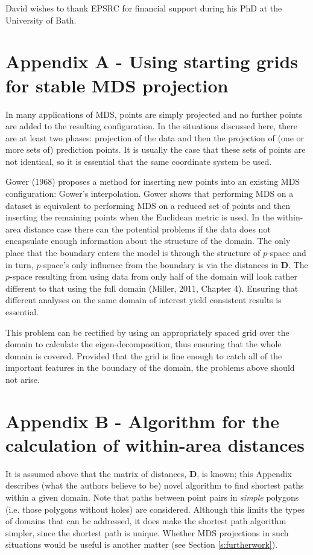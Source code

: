 \documentclass[useAMS, referee]{biom}
\begin{document}
David wishes to thank EPSRC for financial support during his PhD at the University of Bath.


\section*{Appendix A - Using starting grids for stable MDS projection}

In many applications of MDS, points are simply projected and no further points are added to the resulting configuration. In the situations discussed here, there are at least two phases: projection of the data and then the projection of (one or more sets of) prediction points. It is usually the case that these sets of points are not identical, so it is essential that the same coordinate system be used.

Gower (1968) proposes a method for inserting new points into an existing MDS configuration: Gower's interpolation. Gower shows that performing MDS on a dataset is equivalent to performing MDS on a reduced set of points and then inserting the remaining points when the Euclidean metric is used. In the within-area distance case there can the potential problems if the data does not encapsulate enough information about the structure of the domain. The only place that the boundary enters the model is through the structure of $p$-space and in turn, $p$-space's only influence from the boundary is via the distances in $\mathbf{D}$. The $p$-space resulting from using data from only half of the domain will look rather different to that using the full domain (Miller, 2011, Chapter 4). Ensuring that different analyses on the same domain of interest yield consistent results is essential.

This problem can be rectified by using an appropriately spaced grid over the domain to calculate the eigen-decomposition, thus ensuring that the whole domain is covered. Provided that the grid is fine enough to catch all of the important features in the boundary of the domain, the problems above should not arise.

\section*{Appendix B - Algorithm for the calculation of within-area distances}

It is assumed above that the matrix of distances, $\mathbf{D}$, is known; this Appendix describes (what the authors believe to be) novel algorithm to find shortest paths within a given domain. Note that paths between point pairs in \textit{simple} polygons (i.e. those polygons without holes) are considered. Although this limits the types of domains that can be addressed, it does make the shortest path algorithm simpler, since the shortest path is unique. Whether MDS projections in such situations would be useful is another matter (see Section \ref{s:furtherwork}).
\end{document}
